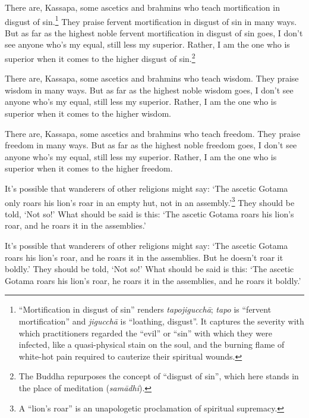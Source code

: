 \documentclass[12pt,openany]{book}%
\begin{document}
There are, Kassapa, some ascetics and brahmins who teach mortification in disgust of sin.\footnote{“Mortification in disgust of sin” renders \textit{\textsanskrit{tapojigucchā}}; \textit{tapo} is “fervent mortification” and \textit{\textsanskrit{jigucchā}} is “loathing, disgust”. It captures the severity with which practitioners regarded the “evil” or “sin” with which they were infected, like a quasi-physical stain on the soul, and the burning flame of white-hot pain required to cauterize their spiritual wounds. } They praise fervent mortification in disgust of sin in many ways. But as far as the highest noble fervent mortification in disgust of sin goes, I don’t see anyone who’s my equal, still less my superior. Rather, I am the one who is superior when it comes to the higher disgust of sin.\footnote{The Buddha repurposes the concept of “disgust of sin”, which here stands in the place of meditation (\textit{\textsanskrit{samādhi}}). } 

There are, Kassapa, some ascetics and brahmins who teach wisdom. They praise wisdom in many ways. But as far as the highest noble wisdom goes, I don’t see anyone who’s my equal, still less my superior. Rather, I am the one who is superior when it comes to the higher wisdom. 

There are, Kassapa, some ascetics and brahmins who teach freedom. They praise freedom in many ways. But as far as the highest noble freedom goes, I don’t see anyone who’s my equal, still less my superior. Rather, I am the one who is superior when it comes to the higher freedom. 

It’s possible that wanderers of other religions might say: ‘The ascetic Gotama only roars his lion’s roar in an empty hut, not in an assembly.’\footnote{A “lion’s roar” is an unapologetic proclamation of spiritual supremacy. } They should be told, ‘Not so!’ What should be said is this: ‘The ascetic Gotama roars his lion’s roar, and he roars it in the assemblies.’ 

It’s possible that wanderers of other religions might say: ‘The ascetic Gotama roars his lion’s roar, and he roars it in the assemblies. But he doesn’t roar it boldly.’ They should be told, ‘Not so!’ What should be said is this: ‘The ascetic Gotama roars his lion’s roar, he roars it in the assemblies, and he roars it boldly.’ 
\end{document}
